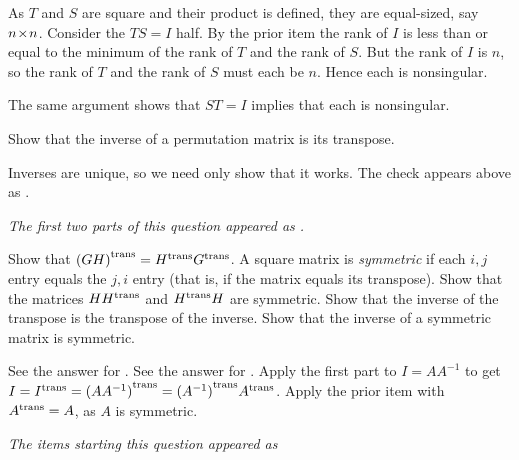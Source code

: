 \begin{exercises}
\begin{answer}
\begin{exparts}
          As \( T \) and \( S \) are square and their product is defined,
          they are equal-sized, say \( n \! \times \! n \).
          Consider the \( TS=I \) half.
          By the prior item the rank of \( I \) is less than or equal to
          the minimum of the rank of \( T \) and the rank of \( S \).
          But the rank of \( I \) is \( n \), so the rank of \( T \) and
          the rank of \( S \) must each be \( n \).
          Hence each is nonsingular.

          The same argument shows that \( ST=I \) implies that 
          each is nonsingular.
      \end{exparts}  
    \end{answer}
  \item 
    Show that the inverse of a permutation matrix is its transpose.
    \begin{answer}
      Inverses are unique, so we need only show that it works.
      The check appears above as
      .  
    \end{answer}
  \item 
    \textit{The first two parts of this question appeared as
    .}
    \begin{exparts}
      \partsitem Show that \( {{(GH)}^{\rm trans}}={{H}^{\rm trans}}{{G}^{\rm trans}} \).
      \partsitem A square matrix is {\em symmetric\/} if each 
        \( i,j \) entry equals the
        \( j,i \) entry (that is, if the matrix equals its transpose).
        Show that 
        the matrices \( H{{H}^{\rm trans}} \) and \( {{H}^{\rm trans}}H \) are symmetric.
      \partsitem Show that the inverse of the transpose is the transpose 
        of the inverse.
      \partsitem Show that the inverse of a symmetric matrix is symmetric.
    \end{exparts}
    \begin{answer}
      \begin{exparts}
        \partsitem See the answer for .
        \partsitem See the answer for .
        \partsitem Apply the first part to  
          \( I=AA^{-1} \) to get
          $I={{I}^{\rm trans}}={{(AA^{-1})}^{\rm trans}}={{(A^{-1})}^{\rm trans}}{{A}^{\rm trans}}$.
        \partsitem Apply the prior item with \( {{A}^{\rm trans}}=A \),
          as \( A \) is symmetric.
      \end{exparts}  
    \end{answer}
  \recommended \item
    \textit{The items starting this question appeared as
}
\end{exercises}
